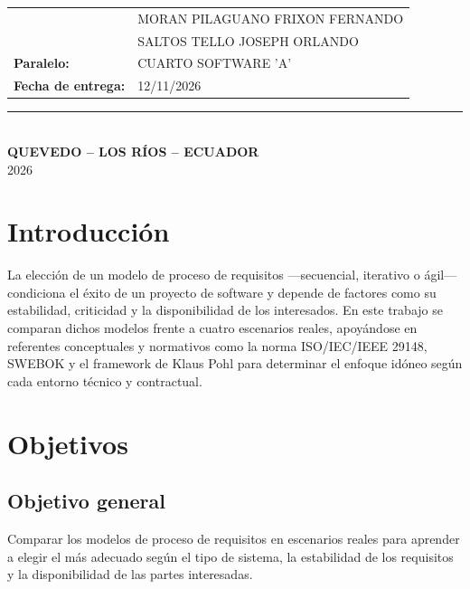 \documentclass[11pt,a4paper]{article}
\begin{document}
\begin{titlepage}
\begin{minipage}{0.85\textwidth}
\begin{tabular}{@{}>{\bfseries}p{3.2cm}p{9cm}@{}}
				&
				MORAN PILAGUANO FRIXON FERNANDO \\
				
				&
				SALTOS TELLO JOSEPH ORLANDO \\
				
				Paralelo: &
				CUARTO SOFTWARE  'A'\\
				
				Fecha de entrega: &
				12/11/2026 \\
				
			\end{tabular}
		\end{minipage}
		
		\vfill
		
		{\color{azulTabla}\rule{0.85\textwidth}{0.8pt}}\\[0.4cm]
		
		{\normalsize\textbf{QUEVEDO -- LOS RÍOS -- ECUADOR}}\\[0.15cm]
		{\normalsize 2026}
		
	\end{titlepage}
	
	
	\section{Introducción}
	
La elección de un modelo de proceso de requisitos —secuencial, iterativo o ágil— condiciona el éxito de un proyecto de software y depende de factores como su estabilidad, criticidad y la disponibilidad de los interesados. En este trabajo se comparan dichos modelos frente a cuatro escenarios reales, apoyándose en referentes conceptuales y normativos como la norma ISO/IEC/IEEE 29148, SWEBOK y el framework de Klaus Pohl para determinar el enfoque idóneo según cada entorno técnico y contractual.
	
	\section{Objetivos}
	
	\subsection{Objetivo general}
	
	Comparar los modelos de proceso de requisitos en escenarios reales para aprender a elegir el más adecuado según el tipo de sistema, la estabilidad de los requisitos y la disponibilidad de las partes interesadas.
	
\end{document}
